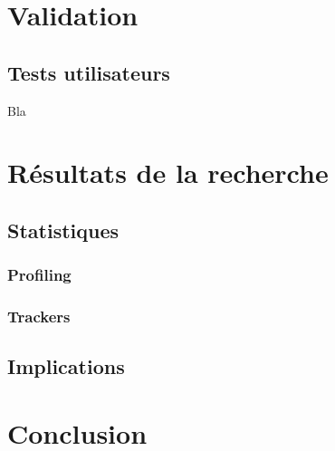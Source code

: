 
\section{Validation}

	\subsection{Tests utilisateurs}

	Bla

\section{Résultats de la recherche}

	\subsection{Statistiques}

		\subsubsection{Profiling}

		\subsubsection{Trackers}

	\subsection{Implications}

\section{Conclusion}